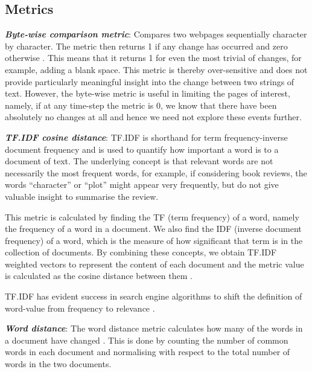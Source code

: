 \documentclass[10pt, a4paper]{article}
\begin{document}
\subsection{Metrics}
\textit{\textbf{Byte-wise comparison metric}}:
Compares two webpages sequentially character by character. The metric then returns 1 if any change has occurred and zero otherwise \cite{brewington2000dynamic, cho1999evolution,kim2005empirical}. This means that it returns 1 for even the most trivial of changes, for example, adding a blank space. This metric is thereby over-sensitive and does not provide particularly meaningful insight into the change between two strings of text. However, the byte-wise metric is useful in limiting the pages of interest, namely, if at any time-step the metric is 0, we know that there have been absolutely no changes at all and hence we need not explore these events further.

\textit{\textbf{TF.IDF cosine distance}}:
TF.IDF is shorthand for term frequency-inverse document frequency and is used to quantify how important a word is to a document of text. The underlying concept is that relevant words are not necessarily the most frequent words, for example, if considering book reviews, the words ``character'' or ``plot'' might appear very frequently, but do not give valuable insight to summarise the review. 

This metric is calculated by finding the TF (term frequency) of a word, namely the frequency of a word in a document. We also find the IDF (inverse document frequency) of a word, which is the measure of how significant that term is in the collection of documents. By combining these concepts, we obtain TF.IDF weighted vectors to represent the content of each document and the metric value is calculated as the cosine distance between them \cite{salton1986introduction}. 

TF.IDF has evident success in search engine algorithms to shift the definition of word-value from frequency to relevance \cite{beel2016paper}.

\textit{\textbf{Word distance}}:
The word distance metric calculates how many of the words in a document have changed \cite{ntoulas2004s}. This is done by counting the number of common words in each document and normalising with respect to the total number of words in the two documents. 
\end{document}
